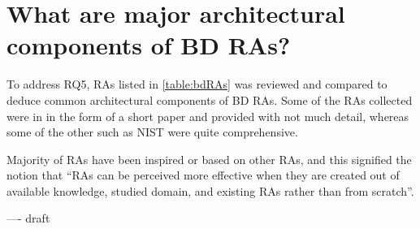 \documentclass[review]{elsarticle}
\begin{document}
\section{What are major architectural components of BD RAs? }

To address RQ5, RAs listed in \ref{table:bdRAs} was reviewed and compared to deduce common architectural components of BD RAs. Some of the RAs collected were in in the form of a short paper and provided with not much detail, whereas some of the other such as NIST were quite comprehensive. 

Majority of RAs have been inspired or based on other RAs, and this signified the notion that “RAs can be perceived more effective when they are created out of available knowledge, studied domain, and existing RAs rather than from scratch”.


---- draft
\end{document}
